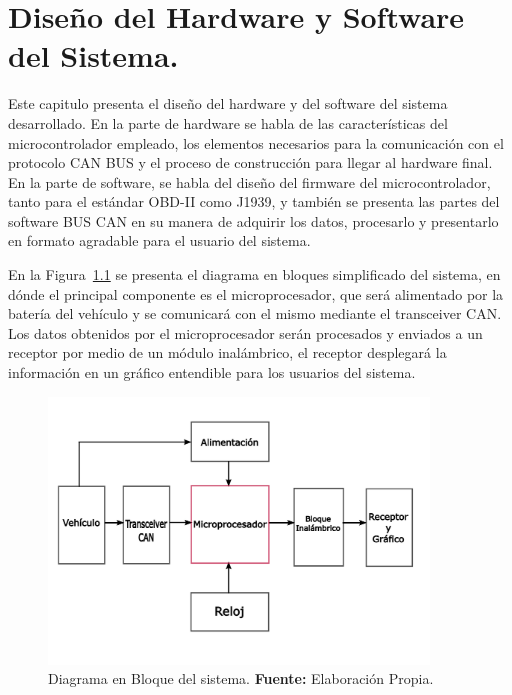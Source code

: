 \chapter[Diseño del Hardware y Software del Sistema]{Diseño del Hardware y Software del Sistema.}

Este capitulo presenta el diseño del hardware y del software del sistema desarrollado. En la parte de hardware se habla de las características del microcontrolador empleado, los elementos necesarios para la comunicación con el protocolo CAN BUS y el proceso de construcción para llegar al hardware final. En la parte de software, se habla del diseño del firmware del microcontrolador, tanto para el estándar OBD-II como J1939, y también se presenta las partes del software BUS CAN en su manera de adquirir los datos, procesarlo y presentarlo en formato agradable para el usuario del sistema. 

En la Figura~\ref{fig_bloque_c4} se presenta el diagrama en bloques simplificado del sistema, en dónde el principal componente es el microprocesador, que será alimentado por la batería del vehículo y se comunicará con el mismo mediante el transceiver CAN.  
Los datos obtenidos por el microprocesador serán procesados y enviados a un receptor por medio de un módulo inalámbrico, el receptor desplegará la información en un gráfico entendible para los usuarios del sistema. 
\begin{figure}[H]
	\centering
		\includegraphics[width=0.9\textwidth]{./Cap4imagen/bloqueHardware.pdf}
	\caption[Diagrama en Bloque del sistema.]{Diagrama en Bloque del sistema.\textbf{ Fuente:}  Elaboración Propia.}
	\label{fig_bloque_c4} %
\end{figure}

